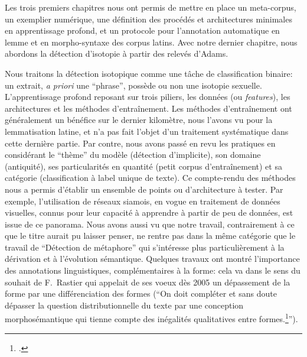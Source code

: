 Les trois premiers chapitres nous ont permis de mettre en place un meta-corpus, un exemplier numérique, une définition des procédés et architectures minimales en apprentissage profond, et un protocole pour l'annotation automatique en lemme et en morpho-syntaxe des corpus latins. Avec notre dernier chapitre, nous abordons la détection d'isotopie à partir des relevés d'Adams.

Nous traitons la détection isotopique comme une tâche de classification binaire: un extrait, \textit{a priori} une \enquote{phrase}, possède ou non une isotopie sexuelle. L'apprentissage profond reposant sur trois piliers, les données (ou \textit{features}), les architectures et les méthodes d'entraînement. Les méthodes d'entraînement ont généralement un bénéfice sur le dernier kilomètre, nous l'avons vu pour la lemmatisation latine, et n'a pas fait l'objet d'un traitement systématique dans cette dernière partie. Par contre, nous avons passé en revu les pratiques en considérant le \enquote{thème} du modèle (détection d'implicite), son domaine (antiquité), ses particularités en quantité (petit corpus d'entraînement) et sa catégorie (classification à label unique de texte). Ce compte-rendu des méthodes nous a permis d'établir un ensemble de points ou d'architecture à tester. Par exemple, l'utilisation de réseaux siamois, en vogue en traitement de données visuelles, connus pour leur capacité à apprendre à partir de peu de données, est issue de ce panorama. Nous avons aussi vu que notre travail, contrairement à ce que le titre aurait pu laisser penser, ne rentre pas dans la même catégorie que le travail de \enquote{Détection de métaphore} qui s'intéresse plus particulièrement à la dérivation et à l'évolution sémantique. Quelques travaux ont montré l'importance des annotations linguistiques, complémentaires à la forme: cela va dans le sens du souhait de F.~Rastier qui appelait de ses voeux dès 2005 un dépassement de la forme par une différenciation des formes (\enquote{On doit compléter et sans doute dépasser la question distributionnelle du texte par une conception morphosémantique qui tienne compte des inégalités qualitatives entre formes.\footcite[p.~100]{rastier2005enjeux}}).

